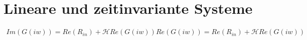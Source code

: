 \section{Lineare und zeitinvariante Systeme}

\begin{align}
Im(G(iw)) = Re(R_{in}) + \mathscr{H}{Re(G(iw))}
Re(G(iw)) = Re(R_{in}) + \mathscr{H}{Re(G(iw))}
\end{align}

